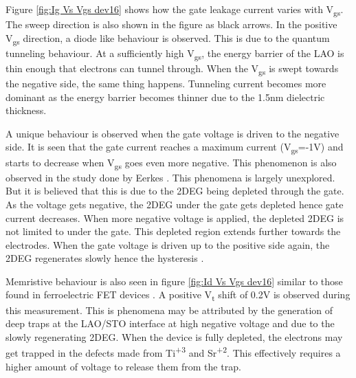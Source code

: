 \documentclass[11pt,a4paper]{report}
\begin{document}
Figure \ref{fig:Ig Vs Vgs dev16} shows how the gate leakage current varies with V\textsubscript{gs}. The sweep direction is also shown in the figure as black arrows. In the positive V\textsubscript{gs} direction, a diode like behaviour is observed. This is due to the quantum tunneling behaviour. At a sufficiently high V\textsubscript{gs}, the energy barrier of the LAO is thin enough that electrons can tunnel through. When the V\textsubscript{gs} is swept towards the negative side, the same thing happens. Tunneling current becomes more dominant as the energy barrier becomes thinner due to the 1.5\si{\nano\metre} dielectric thickness.

A unique behaviour is observed when the gate voltage is driven to the negative side. It is seen that the gate current reaches a maximum current (V\textsubscript{gs}=-1V) and starts to decrease when V\textsubscript{gs} goes even more negative. This phenomenon is also observed in the study done by Eerkes \cite{Peter_PHD_Thesis}. This phenomena is largely unexplored. But it is believed that this is due to the 2DEG being depleted through the gate. As the voltage gets negative, the 2DEG under the gate gets depleted hence gate current decreases. When more negative voltage is applied, the depleted 2DEG is not limited to under the gate. This depleted region extends further towards the electrodes. When the gate voltage is driven up to the positive side again, the 2DEG regenerates slowly hence the hysteresis \cite{Peter_PHD_Thesis, kim_kim_lim_jeong_kwon_baek_kim_2015}.

Memristive behaviour is also seen in figure \ref{fig:Id Vs Vgs dev16} similar to those found in ferroelectric FET devices \cite{wang_liu_2017}. A positive V\textsubscript{t} shift of 0.2V is observed during this measurement. This is phenomena may be attributed by the generation of deep traps at the LAO/STO interface at high negative voltage \cite{kim_kim_lim_jeong_kwon_baek_kim_2015} and due to the slowly regenerating 2DEG. When the device is fully depleted, the electrons may get trapped in the defects made from Ti\textsuperscript{+3} and Sr\textsuperscript{+2}\cite{yu_zunger_2014}. This effectively requires a higher amount of voltage to release them from the trap.
\end{document}
